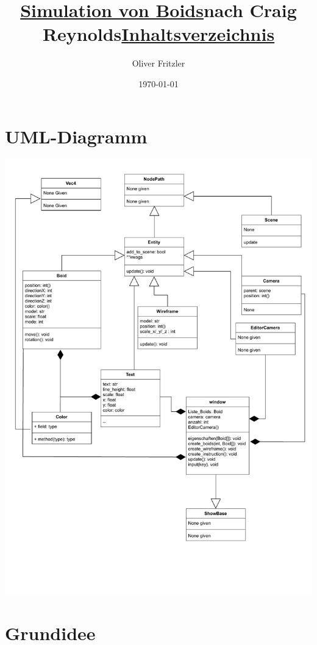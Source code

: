 \documentclass[a4paper, 12pt]{article}
\begin{document}
	\begin{titlepage}
		\title{\Large{\textbf{\underline{Simulation von Boids}}}\linebreak\large\textbf{nach Craig Reynolds}}
		\author{Oliver Fritzler}
		\date{\today}
		\maketitle
	\end{titlepage}

	\title{\Large{\textbf{\underline{Inhaltsverzeichnis}}}}
	\tableofcontents
	\section{UML-Diagramm}
	\includegraphics[scale=0.75, page=1]{UML/Boids_UML.pdf}
	\newpage
	\section{Grundidee}
\end{document}
